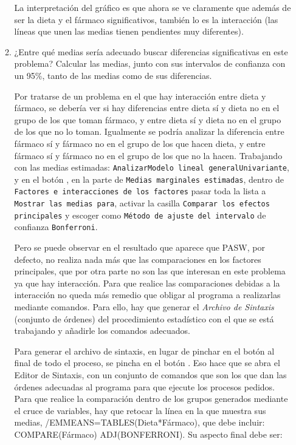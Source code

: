 \begin{enumerate}
\begin{enumerate}
\begin{indicacion}
{La interpretación del gráfico es que ahora se ve claramente que además de ser la dieta y el fármaco significativos, también lo es la interacción (las líneas que unen las medias tienen pendientes muy diferentes).

}
\end{indicacion}

\item ¿Entre qué medias sería adecuado buscar diferencias significativas en este problema? Calcular las medias, junto con sus intervalos de confianza con un 95\%, tanto de las medias como de sus diferencias.

\begin{indicacion}{Por tratarse de un problema en el que hay interacción entre dieta y fármaco, se debería ver si hay diferencias entre dieta sí y dieta no en el grupo de los que toman fármaco, y entre dieta sí y dieta no en el grupo de los que no lo toman. Igualmente se podría analizar la diferencia entre fármaco sí y fármaco no en el grupo de los que hacen dieta, y entre fármaco sí y fármaco no en el grupo de los que no la hacen. Trabajando con las medias estimadas: \texttt{Analizar\flecha Modelo lineal general\flecha Univariante}, y en el botón , en la parte de \texttt{Medias marginales estimadas}, dentro de \texttt{Factores e interacciones de los factores} pasar toda la lista a \texttt{Mostrar las medias para}, activar la casilla \texttt{Comparar los efectos principales} y escoger como \texttt{Método de ajuste del intervalo} de confianza \texttt{Bonferroni}.

Pero se puede observar en el resultado que aparece que PASW, por defecto, no realiza nada más que las comparaciones en los factores principales, que por otra parte no son las que interesan en este problema ya que hay interacción. Para que realice las comparaciones debidas a la interacción no queda más remedio que obligar al programa a realizarlas mediante comandos. Para ello, hay que generar el \emph{Archivo de Sintaxis} (conjunto de órdenes) del procedimiento estadístico con el que se está trabajando y añadirle los comandos adecuados.

Para generar el archivo de sintaxis, en lugar de pinchar en el botón  al final de todo el proceso, se pincha en el botón . Eso hace que se abra el Editor de Sintaxis, con un conjunto de comandos que son los que dan las órdenes adecuadas al programa para que ejecute los procesos pedidos. Para que realice la comparación dentro de los grupos generados mediante el cruce de variables, hay que retocar la línea en la que muestra sus medias, /EMMEANS=TABLES(Dieta*Fármaco), que debe incluir: COMPARE(Fármaco) ADJ(BONFERRONI). Su aspecto final debe ser:

}
\end{indicacion}
\end{enumerate}
\end{enumerate}
